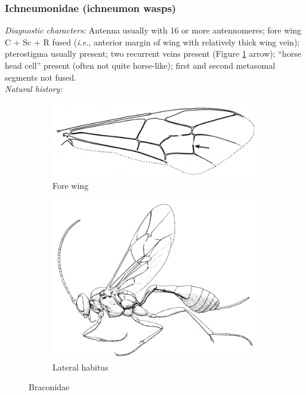 \documentclass[letterpaper, 11pt]{article}
\begin{document}
\subsubsection{Ichneumonidae (ichneumon wasps)}
\noindent{}\textit{Diagnostic characters:} Antenna usually with 16 or more antennomeres; fore wing C + Sc + R fused (\textit{i.e.}, anterior margin of wing with relatively thick wing vein); pterostigma usually present; two recurrent veins present (Figure \ref{fig:ichneumonid1} arrow); ``horse head cell'' present (often not quite horse-like); first and second metasomal segments not fused.\\

\noindent{}\textit{Natural history:} \\

\begin{figure}[ht!]
    \centering
    \begin{subfigure}[ht!]{0.5\textwidth}
        \includegraphics[width=\textwidth]{IchneumonidWing}
        \caption{Fore wing \citep[][pg. 359]{goulet1993hymenoptera}}
        \label{fig:ichneumonid1}
    \end{subfigure}
    \hfill
    \begin{subfigure}[ht!]{0.4\textwidth}
        \includegraphics[width=\textwidth]{IchneumonidHabitus}
        \caption{Lateral habitus \citep[][Fig. 159]{goulet1993hymenoptera}}
        \label{fig:ichneumonid2}
    \end{subfigure}
    \caption{Braconidae}\label{fig:ichneumonids}
\end{figure}
\end{document}
